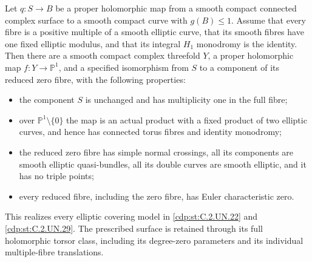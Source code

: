 
\begin{proposition}\label{cdp:st:C.2.UN.34}
Let $q:S\to B$ be a proper holomorphic map from a
smooth compact connected complex surface to a smooth
compact curve with $g(B)\le1$. Assume that every
fibre is a positive multiple of a smooth elliptic
curve, that its smooth fibres have one fixed elliptic
modulus, and that its integral $H_1$ monodromy is
the identity. Then there are a smooth compact complex
threefold $Y$, a proper holomorphic map
$f:Y\to\mathbb P^1$, and a specified isomorphism
from $S$ to a component of its reduced zero fibre,
with the following properties:

\begin{itemize}
\item the component $S$ is unchanged and has
multiplicity one in the full fibre;
\item over $\mathbb P^1\setminus\{0\}$ the map
is an actual product with a fixed product of two
elliptic curves, and hence has connected torus
fibres and identity monodromy;
\item the reduced zero fibre has simple normal
crossings, all its components are smooth elliptic
quasi-bundles, all its double curves are smooth
elliptic, and it has no triple points;
\item every reduced fibre, including the zero
fibre, has Euler characteristic zero.
\end{itemize}
This realizes every elliptic covering model in
\ref{cdp:st:C.2.UN.22} and \ref{cdp:st:C.2.UN.29}. The prescribed surface
is retained through its full holomorphic torsor
class, including its degree-zero parameters and
its individual multiple-fibre translations.
\end{proposition}

